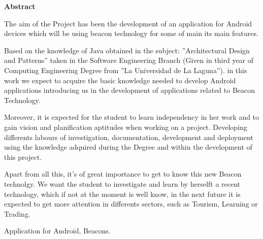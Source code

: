 \documentclass[spanish,a4paper,14pt,oneside]{extreport}
\newenvironment{summary}
{\par\noindent\begin{center}\textbf{Abstract}\end{center}\begin{itshape}\par\noindent}
{\end{itshape}}
\newenvironment{keywords}
{\begin{list}{}{\setlength{\leftmargin}{1em}}\item[\hskip\labelsep \bfseries Keywords:]}
{\end{list}}
\begin{document}
\newpage  %
\begin{summary}
{\em

The aim of the Project has been the development of an application for Android devices which will be using beacon technology for some of main its main features.

\bigskip
Based on the knowledge of Java obtained in the subject: ''Architectural Design and Patterns'' taken in the
Software Engineering Branch (Given in third year of Computing Engineering Degree from ''La Universidad de La Laguna''). 
in this work we expect to acquire the basic knowledge needed to
develop Android applications introducing us in the development of applications related to Beacon Technology.

\bigskip
Moreover, it is expected for the student to learn independency in her work and to gain vision and planification aptitudes when working on a project. Developing differents labours of investigation, documentation, development and deployment using the knowledge adquired during the Degree and within the development of this project.

\bigskip
Apart from all this, it's of great importance to get to know this new Beacon technolgy. We want the student to investigate and learn by herselft a recent technology, which if not at the moment is well know, in the next future it is expected to get more attention in differents sectors, such as Tourism, Learning or Trading.
}

\begin{keywords}
Application for Android, Beacons.
\end{keywords}

\end{summary}

\newpage{\pagestyle{empty}}
\thispagestyle{empty}



\pagestyle{myheadings} %

\renewcommand{\thepage}{\roman{page}}
\setcounter{page}{1}
\end{document}
